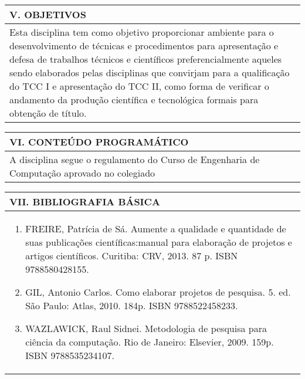 \documentclass[12pt]{article}
\begin{document}
\begin{longtable}{|L{1.025\textwidth}|} \hline
%
{\bf V. OBJETIVOS } \\ \hline
Esta disciplina tem como objetivo proporcionar ambiente para o desenvolvimento de técnicas e procedimentos para apresentação e defesa de trabalhos técnicos e científicos preferencialmente aqueles sendo elaborados pelas disciplinas que convirjam para a qualificação do TCC I e apresentação do TCC II, como forma de verificar o andamento da produção científica e tecnológica formais para obtenção de título.
\\ \hline
\end{longtable}


\begin{longtable}{|L{1.025\textwidth}|} \hline
%
{\bf VI. CONTEÚDO PROGRAMÁTICO } \\ \hline
A disciplina segue o regulamento do Curso de Engenharia de Computação aprovado no colegiado
\\ \hline
\end{longtable} 

\newpage


\begin{longtable}{|L{1.025\textwidth}|} \hline
%
{\bf VII. BIBLIOGRAFIA BÁSICA} \\ \hline

\begin{enumerate}
\item FREIRE, Patrícia de Sá. Aumente a qualidade e quantidade de suas publicações científicas:manual para elaboração de projetos e artigos científicos. Curitiba: CRV, 2013. 87 p. ISBN 9788580428155. 
\item GIL, Antonio Carlos. Como elaborar projetos de pesquisa. 5. ed. São Paulo: Atlas, 2010. 184p. ISBN 9788522458233. 
\item   WAZLAWICK, Raul Sidnei. Metodologia de pesquisa para ciência da computação. Rio de Janeiro: Elsevier, 2009. 159p. ISBN 9788535234107.

\end{enumerate}
 \\ \hline
\end{longtable}


\end{document}

